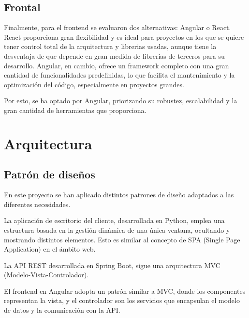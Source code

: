 
\subsection{Frontal}\label{subsec:frontal}

Finalmente, para el frontend se evaluaron dos alternativas: Angular o React.
React proporciona gran flexibilidad y es ideal para proyectos en los que se quiere tener control total de la arquitectura
y librerias usadas, aunque tiene la desventaja de que depende en gran medida de librerias de terceros para su desarrollo.
Angular, en cambio, ofrece un framework completo con una gran cantidad de funcionalidades predefinidas, lo que facilita
el mantenimiento y la optimización del código, especialmente en proyectos grandes.

Por esto, se ha optado por Angular\cite{angular:docs}, priorizando su robustez, escalabilidad y la gran cantidad de
herramientas que proporciona.


\section{Arquitectura}\label{sec:arquitectura}

\subsection{Patrón de diseños}\label{subsec:patron}

En este proyecto se han aplicado distintos patrones de diseño adaptados a las diferentes necesidades.

La aplicación de escritorio del cliente, desarrollada en Python, emplea una estructura basada en la gestión dinámica
de una única ventana, ocultando y mostrando distintos elementos.
Esto es similar al concepto de SPA (Single Page Application) en el ámbito web.

La API REST desarrollada en Spring Boot, sigue una arquitectura MVC (Modelo-Vista-Controlador)\cite{wikipedia:mvc}.

El frontend en Angular adopta un patrón similar a MVC, donde los componentes representan la vista, y el controlador
son los servicios que encapsulan el modelo de datos y la comunicación con la API.

